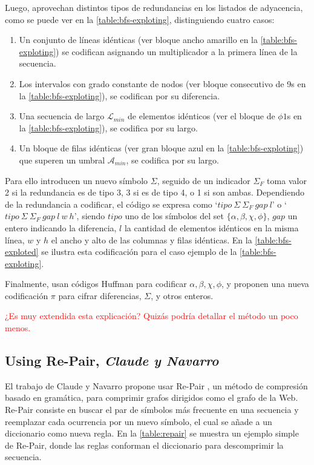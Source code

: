 

Luego, aprovechan distintos tipos de redundancias en los listados de adyacencia, como se puede ver en la \autoref{table:bfs-exploting}, distinguiendo cuatro casos:

\begin{enumerate}
	\item Un conjunto de líneas idénticas (ver bloque ancho amarillo en la \autoref{table:bfs-exploting}) se codifican asignando un multiplicador a la primera línea de la secuencia.
	\item Los intervalos con grado constante de nodos (ver bloque consecutivo de 9s en la \autoref{table:bfs-exploting}), se codifican por su diferencia.
	\item Una secuencia de largo $\mathcal{L}_{min}$ de elementos idénticos (ver el bloque de $\phi1$s en la \autoref{table:bfs-exploting}), se codifica por su largo.
	\item Un bloque de filas idénticas (ver gran bloque azul en la \autoref{table:bfs-exploting}) que superen un umbral $\mathcal{A}_{min}$, se codifica por su largo.
\end{enumerate}



Para ello introducen un nuevo símbolo $\Sigma$, seguido de un indicador $\Sigma_{F}$ toma valor 2 si la redundancia es de tipo 3, 3 si es de tipo 4, o 1 si son ambas. Dependiendo de la redundancia a codificar, el código se expresa como `$tipo\:\Sigma\:\Sigma_{F}\:gap\:l$'  o `$tipo\:\Sigma\:\Sigma_{F}\:gap\:l\:w\:h$', siendo $tipo$ uno de los símbolos del set $\{\alpha, \beta, \chi, \phi\}$, $gap$ un entero indicando la diferencia, $l$ la cantidad de elementos idénticos en la misma línea, $w$ y $h$ el ancho y alto de las columnas y filas idénticas. En la \autoref{table:bfs-exploted} se ilustra esta codificación para el caso ejemplo de la \autoref{table:bfs-exploting}.



Finalmente, usan códigos Huffman para codificar $\alpha, \beta, \chi, \phi$, y proponen una nueva codificación $\pi$ para cifrar diferencias, $\Sigma$, y otros enteros.

\textcolor{red}{¿Es muy extendida esta explicación? Quizás podría detallar el método un poco menos.}


\subsection{Using Re-Pair, \textit{Claude y Navarro}}
El trabajo de Claude y Navarro \cite{claude2010fast} propone usar Re-Pair \cite{larsson2000off}, un método de compresión basado en gramática, para comprimir grafos dirigidos como el grafo de la Web. Re-Pair consiste en buscar el par de símbolos más frecuente en una secuencia y reemplazar cada ocurrencia por un nuevo símbolo, el cual se añade a un diccionario como nueva regla. En la \autoref{table:repair} se muestra un ejemplo simple de Re-Pair, donde las reglas conforman el diccionario para descomprimir la secuencia.

